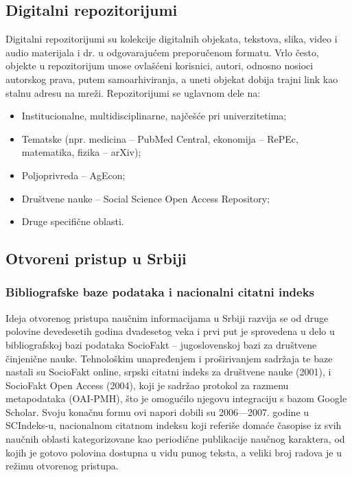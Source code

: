 \documentclass{article}
\begin{document}
\subsection{Digitalni repozitorijumi}

Digitalni repozitorijumi su kolekcije digitalnih objekata, tekstova, slika, video i audio materijala i dr. u odgovarajućem preporučenom formatu. Vrlo često, objekte u repozitorijum unose ovlašćeni korisnici, autori, odnosno nosioci autorskog prava, putem samoarhiviranja, a uneti objekat dobija trajni link kao stalnu adresu na mreži. Repozitorijumi se uglavnom dele na:

\begin{itemize}
    \item Institucionalne, multidisciplinarne, najčešće pri univerzitetima;
    \item Tematske (npr. medicina – PubMed Central, ekonomija – RePEc, matematika, fizika – arXiv);
    \item Poljoprivreda – AgEcon;
    \item Društvene nauke – Social Science Open Access Repository;
    \item Druge specifične oblasti.
\end{itemize}

\subsection{Otvoreni pristup u Srbiji}

\subsubsection{Bibliografske baze podataka i nacionalni citatni indeks}

Ideja otvorenog pristupa naučnim informacijama u Srbiji razvija se od druge polovine devedesetih godina dvadesetog veka i prvi put je sprovedena u delo u bibliografskoj bazi podataka SocioFakt – jugoslovenskoj bazi za društvene činjenične nauke. Tehnološkim unapređenjem i proširivanjem sadržaja te baze nastali su SocioFakt online, srpski citatni indeks za društvene nauke (2001), i SocioFakt Open Access (2004), koji je sadržao protokol za razmenu metapodataka (OAI-PMH), što je omogućilo njegovu integraciju s bazom Google Scholar. Svoju konačnu formu ovi napori dobili su 2006—2007. godine u SCIndeks-u, nacionalnom citatnom indeksu koji referiše domaće časopise iz svih naučnih oblasti kategorizovane kao periodične publikacije naučnog karaktera, od kojih je gotovo polovina dostupna u vidu punog teksta, a veliki broj radova je u režimu otvorenog pristupa.
\end{document}
